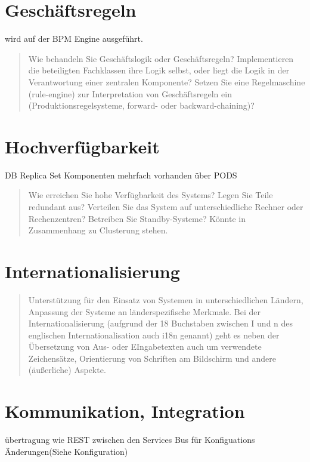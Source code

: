 \section{Geschäftsregeln}

wird auf der BPM Engine ausgeführt.
\begin{quote}
	Wie behandeln Sie Geschäftslogik oder Geschäftsregeln? Implementieren die beteiligten Fachklassen ihre Logik selbst, oder liegt die Logik in der Verantwortung einer zentralen Komponente? Setzen Sie eine Regelmaschine (rule-engine) zur Interpretation von Geschäftsregeln ein (Produktionsregelsysteme, forward- oder backward-chaining)?
\end{quote}

\section{Hochverfügbarkeit}

DB Replica Set
Komponenten mehrfach vorhanden über PODS

\begin{quote}
	Wie erreichen Sie hohe Verfügbarkeit des Systems? Legen Sie Teile redundant aus? Verteilen Sie das System auf unterschiedliche Rechner oder Rechenzentren? Betreiben Sie Standby-Systeme?
	Könnte in Zusammenhang zu Clusterung stehen.
\end{quote}

\section{Internationalisierung}

\begin{quote}
	Unterstützung für den Einsatz von Systemen in unterschiedlichen Ländern, Anpassung der Systeme an länderspezifische Merkmale. Bei der Internationalisierung (aufgrund der 18 Buchstaben zwischen I und n des englischen Internationalisation auch i18n genannt) geht es neben der Übersetzung von Aus- oder EIngabetexten auch um verwendete Zeichensätze, Orientierung von Schriften am Bildschirm und andere (äußerliche) Aspekte.
\end{quote}

\section{Kommunikation, Integration}

übertragung wie REST zwischen den Services Bus für Konfiguations Änderungen(Siehe Konfiguration)

